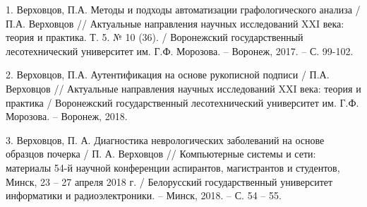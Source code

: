 1. Верховцов, П.А. Методы и подходы автоматизации графологического анализа / П.А. Верховцов // Актуальные направления научных исследований XXI века: теория и практика. Т. 5. № 10 (36). / Воронежский государственный лесотехнический университет им. Г.Ф. Морозова. – Воронеж, 2017. – С. 99-102.

2. Верховцов, П.А. Аутентификация на основе рукописной подписи / П.А. Верховцов // Актуальные направления научных исследований XXI века: теория и практика / Воронежский государственный лесотехнический университет им. Г.Ф. Морозова. – Воронеж, 2018.

3. Верховцов, П. А. Диагностика неврологических заболеваний на основе образцов почерка / П. А. Верховцов // Компьютерные системы и сети: материалы 54-й научной конференции аспирантов, магистрантов и студентов, Минск, 23 – 27 апреля 2018 г. / Белорусский государственный университет информатики и радиоэлектроники. – Минск, 2018. – С. 54 – 55.

\clearpage